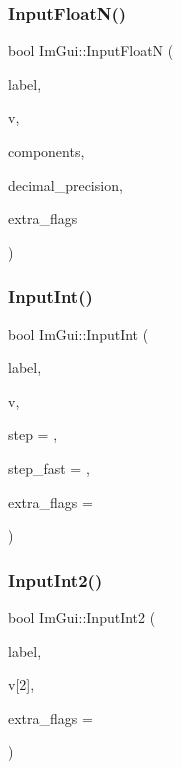 \hypertarget{namespace_im_gui_a7fe2c74d1c0042b77d8e6788faed0983}{}\label{namespace_im_gui_a7fe2c74d1c0042b77d8e6788faed0983} 
\subsubsection{\texorpdfstring{Input\+Float\+N()}{InputFloatN()}}
{\footnotesize\ttfamily bool Im\+Gui\+::\+Input\+FloatN (\begin{DoxyParamCaption}\item[{const char $\ast$}]{label,  }\item[{float $\ast$}]{v,  }\item[{int}]{components,  }\item[{int}]{decimal\+\_\+precision,  }\item[{Im\+Gui\+Input\+Text\+Flags}]{extra\+\_\+flags }\end{DoxyParamCaption})}

\hypertarget{namespace_im_gui_a8b5e9de08c18d6053d2f718b99be94a6}{}\label{namespace_im_gui_a8b5e9de08c18d6053d2f718b99be94a6} 
\subsubsection{\texorpdfstring{Input\+Int()}{InputInt()}}
{\footnotesize\ttfamily bool Im\+Gui\+::\+Input\+Int (\begin{DoxyParamCaption}\item[{const char $\ast$}]{label,  }\item[{int $\ast$}]{v,  }\item[{int}]{step = {},  }\item[{int}]{step\+\_\+fast = {},  }\item[{Im\+Gui\+Input\+Text\+Flags}]{extra\+\_\+flags = {} }\end{DoxyParamCaption})}

\hypertarget{namespace_im_gui_a4142cc4545d789d76d51dee61c959a03}{}\label{namespace_im_gui_a4142cc4545d789d76d51dee61c959a03} 
\subsubsection{\texorpdfstring{Input\+Int2()}{InputInt2()}}
{\footnotesize\ttfamily bool Im\+Gui\+::\+Input\+Int2 (\begin{DoxyParamCaption}\item[{const char $\ast$}]{label,  }\item[{int}]{v\mbox{[}2\mbox{]},  }\item[{Im\+Gui\+Input\+Text\+Flags}]{extra\+\_\+flags = {} }\end{DoxyParamCaption})}

